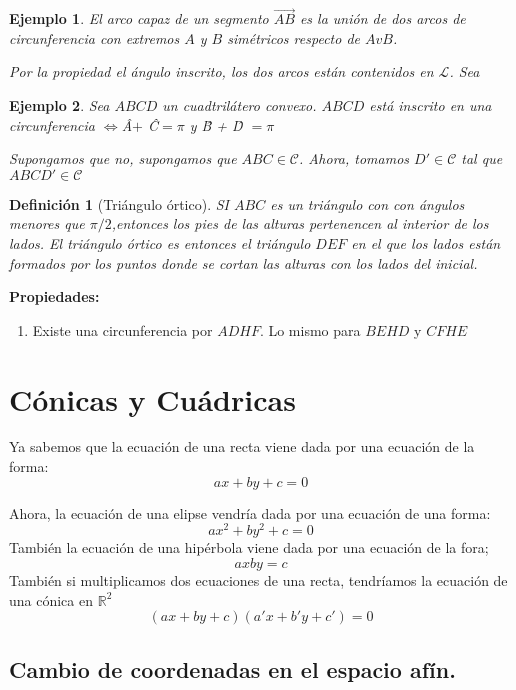 \documentclass[11pt, a4paper]{article}
\makeatletter
\newif\IfInSansMode
\let\oldsf\sffamily
\renewcommand*{\sffamily}{\oldsf\mathversion{sans}\InSansModetrue}
\let\oldnorm\normalfont
\renewcommand*{\normalfont}{\oldnorm\InSansModefalse\mathversion{normal}}
\renewenvironment{proof}[1][\proofname] {\vspace{-15pt}\par\pushQED{\qed}\normalfont\topsep6\p@\@plus6\p@\relax\trivlist\item[\hskip\labelsep\it#1\@addpunct{.}]\ignorespaces}{\popQED\endtrivlist\@endpefalse}
\newcommand{\R}{\mathbb{R}}
\renewcommand{\vec}{\overrightarrow}
\renewenvironment{proof}[1][\proofname] {\par\pushQED{\qed}\normalfont\topsep6\p@\@plus6\p@\relax\trivlist\item[\hskip\labelsep\itshape\sffamily#1\@addpunct{.}]\ignorespaces}{\popQED\endtrivlist\@endpefalse}
\theoremstyle{theorem-style}
\theoremstyle{definition-style}
\newtheorem{ndef}{Definición}[section]
\theoremstyle{remark-style}
\theoremstyle{example-style}
\newtheorem{ejemplo}{Ejemplo}[section]
\newenvironment{nlist}
{\begin{enumerate}
    \renewcommand\labelenumi{(\emph{\roman{enumi})}}}
  {\end{enumerate}}
\makeatother
\begin{document}
\begin{ejemplo}
	El arco capaz de un segmento $\vec{AB}$ es la unión de dos arcos de circunferencia con extremos $A$ y $B$ simétricos respecto de $AvB$.
	
	\begin{proof}[Solución]
	Por la propiedad el ángulo inscrito, los dos arcos están contenidos en $\mathcal L$. Sea 
	
\end{proof}
\end{ejemplo}
\begin{ejemplo}
	Sea $ABCD$ un cuadtrilátero convexo. $ABCD$ está inscrito en una circunferencia $\iff $\^{A}$ +$ \^{C}$ = \pi$ y \^{B} + \^{D} $ = \pi$
	\begin{proof}
	Supongamos que no, supongamos que $ABC \in \mathcal C$. Ahora, tomamos $D' \in \mathcal C$ tal que $ABCD' \in \mathcal C $
\end{proof}
\end{ejemplo}

\begin{ndef}[Triángulo órtico]
	SI $ABC$ es un triángulo con con ángulos menores que $\pi/2$,entonces los pies de las alturas pertenencen al interior de los lados. El triángulo órtico es entonces el triángulo $DEF$ en el que los lados están formados por los puntos donde se cortan las alturas con los lados del inicial.
\end{ndef}

\textbf{Propiedades:}\\
\begin{nlist}
	\item Existe una circunferencia por $ADHF$. Lo mismo para $BEHD$ y $CFHE$
\end{nlist}

\section{Cónicas y Cuádricas}
Ya sabemos que la ecuación de una recta viene dada por una ecuación de la forma:
\[
ax + by +c = 0
\]

Ahora, la ecuación de una elipse vendría dada por una ecuación de una forma:
\[
ax^2 + by^2 + c = 0
\]
También la ecuación de una hipérbola viene dada por una ecuación de la fora;
\[
axby = c
\]
También si multiplicamos dos ecuaciones de una recta, tendríamos la ecuación de una cónica en $\R^2$
\[
(ax + by +c)(a'x+b'y+c') = 0
\]

\subsection{Cambio de coordenadas en el espacio afín.}
\end{document}
